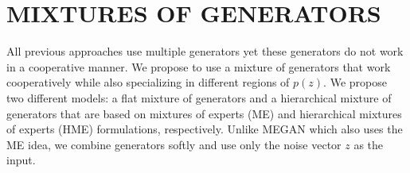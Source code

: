 \documentclass[a4paper,onesided,12pt]{report}
\begin{document}
\chapter{MIXTURES OF GENERATORS}
\label{chapter:mixture_gan}
All previous approaches use multiple generators yet these generators do not work in a cooperative manner. We propose to use a mixture of generators that work cooperatively while also specializing in different regions of $p(z)$. We propose two different models: a flat mixture of generators and a hierarchical mixture of generators that are based on mixtures of experts (ME) \cite{jacobs1991adaptive} and hierarchical mixtures of experts (HME) \cite{jordan1994hierarchical} formulations, respectively. Unlike MEGAN which also uses the ME idea, we combine generators softly and use only the noise vector $z$ as the input.
\end{document}
